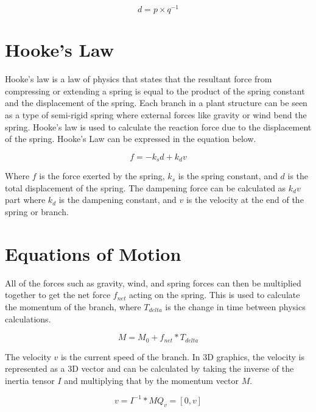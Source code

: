 \begin{equation}
d = p \times q^{-1}
\end{equation}

\section{Hooke's Law}

Hooke's law is a law of physics that states that the resultant force from compressing or extending a spring is equal to the product of the spring constant and the displacement of the spring. Each branch in a plant structure can be seen as a type of semi-rigid spring where external forces like gravity or wind bend the spring. Hooke's law is used to calculate the reaction force due to the displacement of the spring. Hooke's Law can be expressed in the equation below.

\begin{equation}
f = -k _s d + k _d v
\end{equation}

\noindent
Where $f$ is the force exerted by the spring, $k _s$ is the spring constant, and $d$ is the total displacement of the spring. The dampening force can be calculated as $k _d v$ part where $k _d$ is the dampening constant, and $v$ is the velocity at the end of the spring or branch.


\section{Equations of Motion} \label{motion equations}

All of the forces such as gravity, wind, and spring forces can then be multiplied together to get the net force $f_{net}$ acting on the spring. This is used to calculate the momentum of the branch, where $T_{delta}$ is the change in time between physics calculations.

\begin{equation}
M = M_0 + f_{net} * T_{delta}
\end{equation}

\noindent
The velocity $v$ is the current speed of the branch. In 3D graphics, the velocity is represented as a 3D vector and can be calculated by taking the inverse of the inertia tensor $I$ and multiplying that by the momentum vector $M$.

\begin{equation}
v = I^{-1} * M
Q_v = [0, v]
\end{equation}

